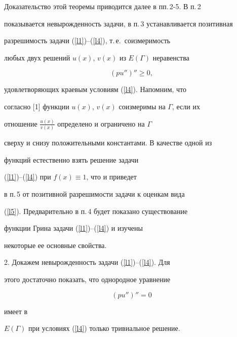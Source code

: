 {{{{{{{\begin{thm}
\end{thm}





Доказательство этой теоремы приводится далее в пп.\,2-5. В п.\,2


показывается невырожденность задачи, в п.\,3 устанавливается позитивная


разрешимость задачи (\ref{l1})--(\ref{l4}), т.\,е.~соизмеримость


любых двух решений $u(x)$, $v(x)$ из $E(\Gamma)$ неравенства


\begin{equation}


\label{l6}


(pu'')''\geq 0,


\end{equation}


удовлетворяющих краевым условиям (\ref{l4}). Напомним, что


согласно [1] функции $u(x)$, $v(x)$ соизмеримы на $\Gamma$, если их


отношение $\frac{u(x)}{v(x)}$ определено и ограничено на $\Gamma$


сверху и снизу положительными константами. В качестве одной из


функций естественно взять решение задачи


(\ref{l1})--(\ref{l4}) при $f(x)\equiv 1$, что и приведет


в п.\,5 от позитивной разрешимости задачи к оценкам вида


(\ref{l5}). Предварительно в п.\,4 будет показано существование


функции Грина задачи (\ref{l1})--(\ref{l4}) и изучены


некоторые ее основные свойства.


\medskip





2. Докажем невырожденность задачи (\ref{l1})--(\ref{l4}). Для


этого достаточно показать, что однородное уравнение


\begin{equation}


\label{l7} (pu'')''= 0


\end{equation}


имеет в


$E(\Gamma)$ при условиях (\ref{l4}) только тривиальное решение.


}}}}}}}
